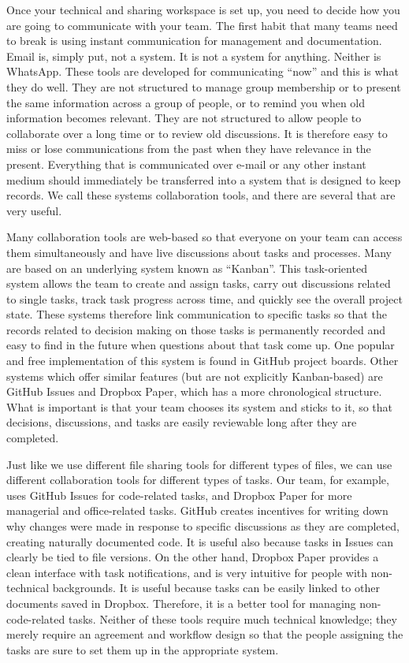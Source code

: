 Once your technical and sharing workspace is set up,
you need to decide how you are going to communicate with your team.
The first habit that many teams need to break
is using instant communication for management and documentation.
Email is, simply put, not a system. It is not a system for anything. Neither is WhatsApp.
These tools are developed for communicating ``now'' and this is what they do well.
They are not structured to manage group membership or to present the same information
across a group of people, or to remind you when old information becomes relevant.
They are not structured to allow people to collaborate over a long time or to review old discussions.
It is therefore easy to miss or lose communications from the past when they have relevance in the present.
Everything that is communicated over e-mail or any other instant medium should
immediately be transferred into a system that is designed to keep records.
We call these systems collaboration tools, and there are several that are very useful.

Many collaboration tools are web-based
so that everyone on your team can access them simultaneously
and have live discussions about tasks and processes.
Many are based on an underlying system known as ``Kanban''.
This task-oriented system allows the team to create and assign tasks,
carry out discussions related to single tasks,
track task progress across time, and quickly see the overall project state.
These systems therefore link communication to specific tasks so that
the records related to decision making on those tasks is permanently recorded
and easy to find in the future when questions about that task come up.
One popular and free implementation of this system is found in GitHub project boards.
Other systems which offer similar features (but are not explicitly Kanban-based)
are GitHub Issues and Dropbox Paper, which has a more chronological structure.
What is important is that your team chooses its system and sticks to it,
so that decisions, discussions, and tasks are easily reviewable long after they are completed.

Just like we use different file sharing tools for different types of files,
we can use different collaboration tools for different types of tasks.
Our team, for example, uses GitHub Issues for code-related tasks,
and Dropbox Paper for more managerial and office-related tasks.
GitHub creates incentives for writing down why changes were made
in response to specific discussions
as they are completed, creating naturally documented code.
It is useful also because tasks in Issues can clearly be tied to file versions.
On the other hand, Dropbox Paper provides a clean interface with task notifications,
and is very intuitive for people with non-technical backgrounds.
It is useful because tasks can be easily linked to other documents saved in Dropbox.
Therefore, it is a better tool for managing non-code-related tasks.
Neither of these tools require much technical knowledge;
they merely require an agreement and workflow design
so that the people assigning the tasks are sure to set them up in the appropriate system.

